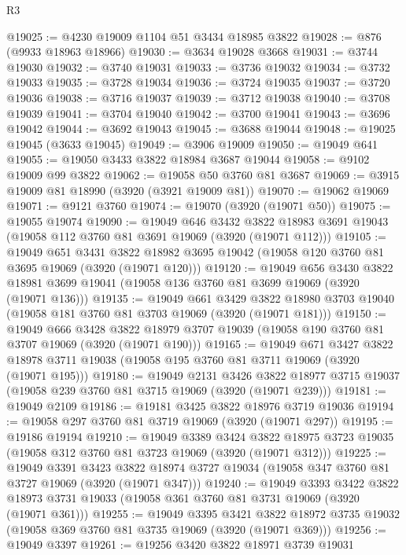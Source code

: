 \begin{lexlean}{R3}
\begin{coremodule}
@19025 := @4230 @19009 @1104 @51 @3434 @18985 @3822
@19028 := @876 (@9933 @18963 @18966)
@19030 := @3634 @19028 @3668
@19031 := @3744 @19030
@19032 := @3740 @19031
@19033 := @3736 @19032
@19034 := @3732 @19033
@19035 := @3728 @19034
@19036 := @3724 @19035
@19037 := @3720 @19036
@19038 := @3716 @19037
@19039 := @3712 @19038
@19040 := @3708 @19039
@19041 := @3704 @19040
@19042 := @3700 @19041
@19043 := @3696 @19042
@19044 := @3692 @19043
@19045 := @3688 @19044
@19048 := @19025 @19045 (@3633 @19045)
@19049 := @3906 @19009
@19050 := @19049 @641
@19055 := @19050 @3433 @3822 @18984 @3687 @19044
@19058 := @9102 @19009 @99 @3822
@19062 := @19058 @50 @3760 @81 @3687
@19069 := @3915 @19009 @81 @18990 (@3920 (@3921 @19009 @81))
@19070 := @19062 @19069
@19071 := @9121 @3760
@19074 := @19070 (@3920 (@19071 @50))
@19075 := @19055 @19074
@19090 := @19049
    @646
    @3432
    @3822
    @18983
    @3691
    @19043
    (@19058 @112 @3760 @81 @3691 @19069 (@3920 (@19071 @112)))
@19105 := @19049
    @651
    @3431
    @3822
    @18982
    @3695
    @19042
    (@19058 @120 @3760 @81 @3695 @19069 (@3920 (@19071 @120)))
@19120 := @19049
    @656
    @3430
    @3822
    @18981
    @3699
    @19041
    (@19058 @136 @3760 @81 @3699 @19069 (@3920 (@19071 @136)))
@19135 := @19049
    @661
    @3429
    @3822
    @18980
    @3703
    @19040
    (@19058 @181 @3760 @81 @3703 @19069 (@3920 (@19071 @181)))
@19150 := @19049
    @666
    @3428
    @3822
    @18979
    @3707
    @19039
    (@19058 @190 @3760 @81 @3707 @19069 (@3920 (@19071 @190)))
@19165 := @19049
    @671
    @3427
    @3822
    @18978
    @3711
    @19038
    (@19058 @195 @3760 @81 @3711 @19069 (@3920 (@19071 @195)))
@19180 := @19049
    @2131
    @3426
    @3822
    @18977
    @3715
    @19037
    (@19058 @239 @3760 @81 @3715 @19069 (@3920 (@19071 @239)))
@19181 := @19049 @2109
@19186 := @19181 @3425 @3822 @18976 @3719 @19036
@19194 := @19058 @297 @3760 @81 @3719 @19069 (@3920 (@19071 @297))
@19195 := @19186 @19194
@19210 := @19049
    @3389
    @3424
    @3822
    @18975
    @3723
    @19035
    (@19058 @312 @3760 @81 @3723 @19069 (@3920 (@19071 @312)))
@19225 := @19049
    @3391
    @3423
    @3822
    @18974
    @3727
    @19034
    (@19058 @347 @3760 @81 @3727 @19069 (@3920 (@19071 @347)))
@19240 := @19049
    @3393
    @3422
    @3822
    @18973
    @3731
    @19033
    (@19058 @361 @3760 @81 @3731 @19069 (@3920 (@19071 @361)))
@19255 := @19049
    @3395
    @3421
    @3822
    @18972
    @3735
    @19032
    (@19058 @369 @3760 @81 @3735 @19069 (@3920 (@19071 @369)))
@19256 := @19049 @3397
@19261 := @19256 @3420 @3822 @18971 @3739 @19031

\end{coremodule}
\end{lexlean}
